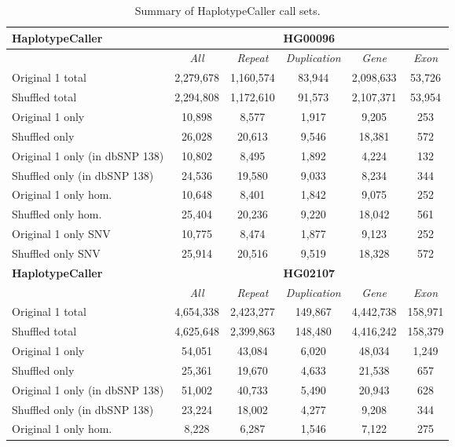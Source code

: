 \begin{table}[htb]
\caption{Summary of HaplotypeCaller call sets. }
\begin{center}
\begin{tabular}{|l|c||c|c|c|c|}
\hline
{\bf HaplotypeCaller} & \multicolumn{5}{|c|}{\bf HG00096} \\
\hline
\cline{2-6}
{\bf} & {\it All} & {\it Repeat} & {\it Duplication} & {\it Gene} & {\it Exon} \\
\hline
Original 1 total & 2,279,678 & 1,160,574 & 83,944 & 2,098,633 & 53,726 \\
\hline
Shuffled total & 2,294,808 & 1,172,610 & 91,573 & 2,107,371 & 53,954 \\
\hline
Original 1 only & 10,898 & 8,577 & 1,917 & 9,205 & 253 \\
\hline
Shuffled only & 26,028 & 20,613 & 9,546 & 18,381 & 572 \\
\hline
Original 1 only (in dbSNP 138) & 10,802 & 8,495 & 1,892 & 4,224 & 132 \\
\hline
Shuffled only (in dbSNP 138) & 24,536 & 19,580 & 9,033 & 8,234 & 344 \\
\hline
Original 1 only hom. & 10,648 & 8,401 & 1,842 & 9,075 & 252 \\
\hline
Shuffled only hom. & 25,404 & 20,236 & 9,220 & 18,042 & 561 \\
\hline
Original 1 only SNV & 10,775 & 8,474 & 1,877 & 9,123 & 252 \\
\hline
Shuffled only SNV & 25,914 & 20,516 & 9,519 & 18,328 & 572 \\ 
\hline
\hline
{\bf HaplotypeCaller} & \multicolumn{5}{|c|}{\bf HG02107} \\
\hline
\cline{2-6}
{\bf} & {\it All} & {\it Repeat} & {\it Duplication} & {\it Gene} & {\it Exon} \\
\hline
Original 1 total & 4,654,338 & 2,423,277 & 149,867 & 4,442,738 & 158,971 \\
\hline
Shuffled total & 4,625,648 & 2,399,863 & 148,480 & 4,416,242 & 158,379 \\
\hline
Original 1 only & 54,051 & 43,084 & 6,020 & 48,034 & 1,249 \\
\hline
Shuffled only & 25,361 & 19,670 & 4,633 & 21,538 & 657 \\
\hline
Original 1 only (in dbSNP 138) & 51,002 & 40,733 & 5,490 & 20,943 & 628 \\
\hline
Shuffled only (in dbSNP 138) & 23,224 & 18,002 & 4,277 & 9,208 & 344 \\
\hline
Original 1 only hom. & 8,228 & 6,287 & 1,546 & 7,122 & 275 \\

\end{tabular}
\end{center}
\end{table}
